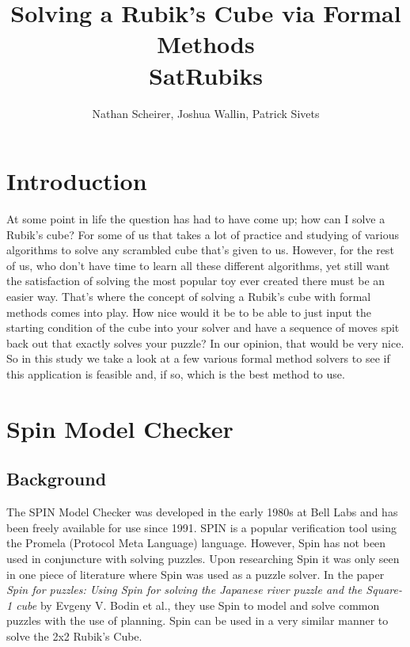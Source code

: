 \documentclass{article}
\begin{document}
\title{Solving a Rubik's Cube via Formal Methods\\[3cm] SatRubiks }

\author{Nathan Scheirer, Joshua Wallin, Patrick Sivets}

\maketitle
\newpage

\section{Introduction}
At some point in life the question has had to have come up; how can I solve a Rubik's cube? For some of us that takes a lot of practice and studying of various algorithms to solve any scrambled cube that's given to us. However, for the rest of us, who don't have time to learn all these different algorithms, yet still want the satisfaction of solving the most popular toy ever created there must be an easier way. That's where the concept of solving a Rubik's cube with formal methods comes into play. How nice would it be to be able to just input the starting condition of the cube into your solver and have a sequence of moves spit back out that exactly solves your puzzle? In our opinion, that would be very nice. So in this study we take a look at a few various formal method solvers to see if this application is feasible and, if so, which is the best method to use. 

\section{Spin Model Checker}
\subsection{Background}
The SPIN Model Checker was developed in the early 1980s at Bell Labs and has been freely available for use since 1991. SPIN is a popular verification tool using the Promela (Protocol Meta Language) language. However, Spin has not been used in conjuncture with solving puzzles. Upon researching Spin it was only seen in one piece of literature where Spin was used as a puzzle solver. In the paper \textit{Spin for puzzles: Using Spin for solving the Japanese river puzzle and the Square-1 cube} by Evgeny V. Bodin et al., they use Spin to model and solve common puzzles with the use of planning. Spin can be used in a very similar manner to solve the 2x2 Rubik's Cube.
\end{document}
